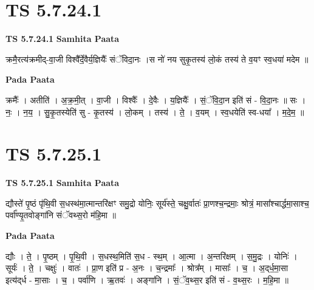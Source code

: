 \documentclass[17pt]{extarticle}
\begin{document}

\section{ TS 5.7.24.1 }

\textbf{TS 5.7.24.1 } \newline
\textbf{Samhita Paata} \newline

क्रमै॒रत्य॑क्रमीद्-वा॒जी विश्वै᳚र्दे॒वैर्य॒ज्ञियैः᳚ संॅविदा॒नः ।स नो॑ नय सुकृ॒तस्य॑ लो॒कं तस्य॑ ते व॒यꣳ स्व॒धया॑ मदेम ॥ \newline

\textbf{Pada Paata} \newline

क्रमैः᳚ । अतीति॑ । अ॒क्र॒मी॒त् । वा॒जी । विश्वैः᳚ । दे॒वैः । य॒ज्ञियैः᳚ । सं॒ॅवि॒दा॒न इति॑ सं - वि॒दा॒नः ॥ सः । नः॒ । न॒य॒ । सु॒कृ॒तस्येति॑ सु - कृ॒तस्य॑ । लो॒कम् । तस्य॑ । ते॒ । व॒यम् । स्व॒धयेति॑ स्व-धया᳚ । म॒दे॒म॒ ॥  \newline





\section{ TS 5.7.25.1 }

\textbf{TS 5.7.25.1 } \newline
\textbf{Samhita Paata} \newline

द्यौस्ते॑ पृ॒ष्ठं पृ॑थि॒वी स॒धस्थ॑मा॒त्मान्तरि॑क्षꣳ समु॒द्रो योनिः॒ सूर्य॑स्ते॒ चक्षु॒र्वातः॑ प्रा॒णश्च॒न्द्रमाः॒ श्रोत्रं॒ मासा᳚श्चार्द्धमा॒साश्च॒ पर्वा᳚ण्यृ॒तवोङ्गा॑नि संॅवथ्स॒रो म॑हि॒मा ॥ \newline

\textbf{Pada Paata} \newline

द्यौः । ते॒ । पृ॒ष्ठम् । पृ॒थि॒वी । स॒धस्थ॒मिति॑ स॒ध - स्थ॒म् । आ॒त्मा । अ॒न्तरि॑क्षम् । स॒मु॒द्रः । योनिः॑ । सूर्यः॑ । ते॒ । चक्षुः॑ । वातः॑ । प्रा॒ण इति॑ प्र - अ॒नः । च॒न्द्रमाः᳚ । श्रोत्र᳚म् । मासाः᳚ । च॒ । अ॒द्‌र्ध॒मा॒सा इत्य॑द्‌र्ध - मा॒साः । च॒ । पर्वा॑णि । ऋ॒तवः॑ । अङ्गा॑नि । सं॒ॅव॒थ्स॒र इति॑ सं - व॒थ्स॒रः । म॒हि॒मा ॥  \newline




\end{document}
